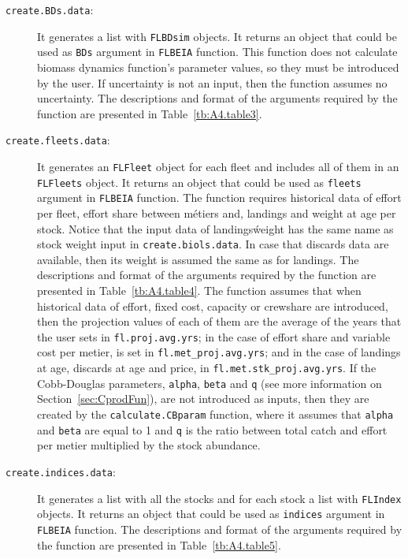 \begin{description}
  \item[\texttt{create.BDs.data}:] It generates a list with \texttt{FLBDsim} objects. It returns an object that could be used as \texttt{BDs} argument in \texttt{FLBEIA} function. This function does not calculate biomass dynamics function's parameter values, so they must be introduced by the user. If uncertainty is not an input, then the function assumes no uncertainty. The descriptions and format of the arguments required by the function are presented in Table~\ref{tb:A4.table3}.
\end{description}

\begin{description}
  \item[\texttt{create.fleets.data}:] It generates an \texttt{FLFleet} object for each fleet and includes all of them in an \texttt{FLFleets} object. It returns an object that could be used as \texttt{fleets} argument in \texttt{FLBEIA} function. The function requires historical data of effort per fleet, effort share between m\'etiers and, landings and weight at age per stock. Notice that the input data of landings\' weight has the same name as stock weight input in \texttt{create.biols.data}. In case that discards data are available, then its weight is assumed the same as for landings. The descriptions and format of the arguments required by the function are presented in Table~\ref{tb:A4.table4}.
  The function assumes that when historical data of effort, fixed cost, capacity or crewshare are introduced, then the projection values of each of them are the average of the years that the user sets in \texttt{fl.proj.avg.yrs}; in the case of effort share and variable cost per metier, is set in \texttt{fl.met\_proj.avg.yrs}; and in the case of landings at age, discards at age and price, in \texttt{fl.met.stk\_proj.avg.yrs}. If the Cobb-Douglas parameters, \texttt{alpha}, \texttt{beta} and \texttt{q} (see more information on Section~\ref{sec:CprodFun}), are not introduced as inputs, then they are created by the \texttt{calculate.CBparam} function, where it assumes that \texttt{alpha} and \texttt{beta} are equal to 1 and \texttt{q} is the ratio between total catch and effort per metier multiplied by the stock abundance.
\end{description}

\begin{description}
  \item[\texttt{create.indices.data}:] It generates a list with all the stocks and for each stock a list with \texttt{FLIndex} objects. It returns an object that could be used as \texttt{indices} argument in \texttt{FLBEIA} function. The descriptions and format of the arguments required by the function are presented in Table~\ref{tb:A4.table5}.
\end{description}


